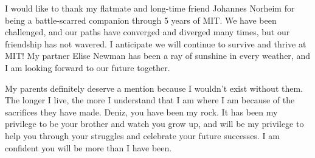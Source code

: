 I would like to thank my flatmate and long-time friend Johannes Norheim
for being a battle-scarred companion through 5 years of MIT. We have been challenged, and
our paths have converged and diverged many times, but our friendship has not wavered.
I anticipate we will continue to survive and thrive at MIT!
My partner Elise Newman has been a ray of sunshine in every weather,
and I am looking forward to our future together.

My parents definitely deserve a mention because I wouldn't exist without them.
The longer I live, the more I understand that I am where I am because of the
sacrifices they have made.
Deniz, you have been my rock. It has been my privilege to be your brother and watch
you grow up, and will be my privilege to help you
through your struggles and celebrate your future successes.
I am confident you will be more than I have been.

